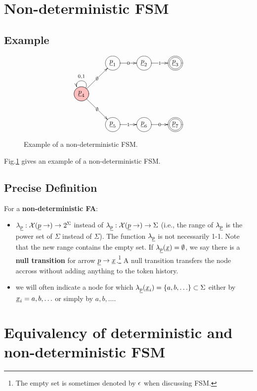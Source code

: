 \section{Non-deterministic FSM}
\subsection{Example}

\begin{figure}
$$
\xymatrix{
&\Circle{\rvp_1}\ar[r]|0
&\Circle{\rvp_2}\ar[r]|1
&\DCircle{\rvp_3}
\\
\PinkCircle{\rvp_4}\ar@(ru,lu)[]_{0,1}
\ar[ru]|\emptyset
\ar[rd]|\emptyset
\\
&\Circle{\rvp_5}\ar[r]|1
&\Circle{\rvp_6}\ar[r]|0
&\DCircle{\rvp_7}
}
$$
\caption{
Example of a 
non-deterministic FSM.}
\label{fig-non-det-fsm}
\end{figure}
Fig.\ref{fig-non-det-fsm}
gives an example of a non-deterministic
FSM.


\subsection{Precise Definition}

\begin{mdframed}[hidealllines=true,backgroundcolor=blue!10]
For a {\bf non-deterministic FA}:
\begin{itemize}
\item
$\lam_\rvp:\calx(\rvp\rarrow)\rarrow 2^\Sigma$ 
instead of 
$\lam_\rvp:\calx(\rvp\rarrow)\rarrow \Sigma$ (i.e., the range of $\lam_\rvp$
is the power set of $\Sigma$ 
instead of $\Sigma$).
The function $\lam_\rvp$ is not necessarily
1-1.
Note that the new range contains the empty set.
If $\lam_\rvp(\rvx)=\emptyset$, we say there is a  {\bf null transition} for arrow 
$\rvp\rarrow \rvx$.\footnote{The empty set is sometimes denoted by $\epsilon$ 
when discussing FSM.} A null transition 
transfers the node accross without adding anything to the token history. 
\item
we will often indicate a node for 
which $\lam_{\rvp}(\rvx_i)=\{a,b, \ldots\}\subset\Sigma$ either by $\rvx_i=a, b, \ldots$
or simply by $a, b, \ldots$. 
\end{itemize}\end{mdframed}

\section{Equivalency of deterministic and non-deterministic FSM}

